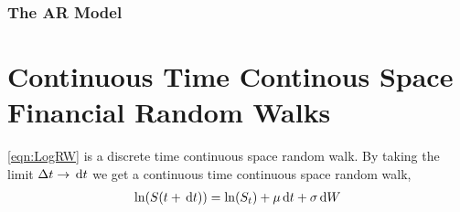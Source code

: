 \subsubsection{The AR Model}


\section{Continuous Time Continous Space Financial Random Walks}

\eqref{eqn:LogRW} is a discrete time continuous space random walk. By taking the limit $\Delta t \to \,\mathrm{d} t$ we get a continuous time continuous space random walk,
\begin{align*}
    \mathrm{ln}\!\left( S(t+\,\mathrm{d} t) \right) = \mathrm{ln}\!\left( S_t \right) + \mu\,\mathrm{d} t + \sigma \,\mathrm{d} W
\end{align*}
